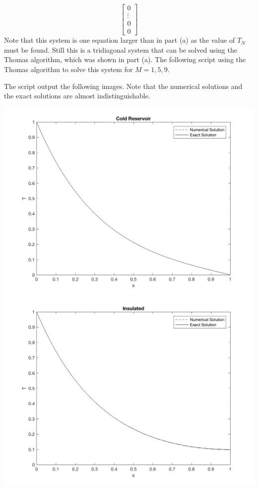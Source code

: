 \documentclass[11pt, oneside]{article}
\begin{document}
\begin{enumerate}
\begin{enumerate}
\[\begin{bmatrix}
            0 \\
            \vdots \\
            0 \\
            0
          \end{bmatrix}
        \]
        Note that this system is one equation larger than in part (a) as
        the value of $T_N$ must be found.
        Still this is a tridiagonal system that can be solved using the Thomas
        algorithm, which was shown in part (a).
        The following script using the Thomas algorithm to solve this system for
        $M = 1, 5, 9$.
        
        The script output the following images.
        Note that the numerical solutions and the exact solutions are
        almost indistinguishable.
        \begin{center}
          \includegraphics[scale=0.5]{Figures/02_02.png}
          \includegraphics[scale=0.5]{Figures/02_03.png}

\end{center}
\end{enumerate}
\end{enumerate}
\end{document}
